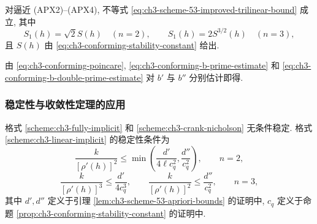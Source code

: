 \begin{Proposition}
\label{prop:ch3-conforming-s1-bound}
对逼近 (APX2)--(APX4), 不等式 \eqref{eq:ch3-scheme-53-improved-trilinear-bound} 成立, 其中
\begin{equation}
S_1(h)=\sqrt2S(h)\quad(n=2),
\qquad S_1(h)=2S^{3/2}(h)\quad(n=3),
\label{eq:ch3-conforming-s1}
\end{equation}
且 $S(h)$ 由 \eqref{eq:ch3-conforming-stability-constant} 给出.
\end{Proposition}

\begin{Proof}
由 \eqref{eq:ch3-conforming-poincare}, \eqref{eq:ch3-conforming-b-prime-estimate} 和 \eqref{eq:ch3-conforming-b-double-prime-estimate} 对 $b'$ 与 $b''$ 分别估计即得.
\end{Proof}

\subsubsection{稳定性与收敛性定理的应用}
格式 \ref{scheme:ch3-fully-implicit} 和 \ref{scheme:ch3-crank-nicholson} 无条件稳定. 格式 \ref{scheme:ch3-linear-implicit} 的稳定性条件为
\begin{equation}
\frac{k}{[\rho'(h)]^2}\leq\min\left(\frac{d'}{4\ell c_q^2},\frac{d''}{c_q^2}\right),
\qquad n=2,
\label{eq:ch3-conforming-scheme53-stability-2d}
\end{equation}
\begin{equation}
\frac{k}{[\rho'(h)]^3}\leq\frac{d'}{4c_q^3},
\qquad
\frac{k}{[\rho'(h)]^2}\leq\frac{d''}{c_q^2},
\qquad n=3,
\label{eq:ch3-conforming-scheme53-stability-3d}
\end{equation}
其中 $d',d''$ 定义于引理 \ref{lem:ch3-scheme-53-apriori-bounds} 的证明中, $c_q$ 定义于命题 \ref{prop:ch3-conforming-stability-constant} 的证明中.

